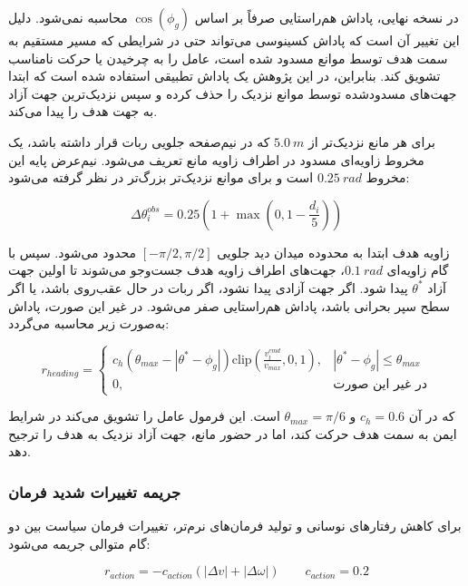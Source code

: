 در نسخه نهایی، پاداش هم‌راستایی صرفاً بر اساس \(\cos(\phi_g)\) محاسبه نمی‌شود. دلیل این تغییر آن است که پاداش کسینوسی می‌تواند حتی در شرایطی که مسیر مستقیم به سمت هدف توسط موانع مسدود شده است، عامل را به چرخیدن یا حرکت نامناسب تشویق کند. بنابراین، در این پژوهش یک پاداش تطبیقی استفاده شده است که ابتدا جهت‌های مسدودشده توسط موانع نزدیک را حذف کرده و سپس نزدیک‌ترین جهت آزاد به جهت هدف را پیدا می‌کند.

برای هر مانع نزدیک‌تر از \(5.0~m\) که در نیم‌صفحه جلویی ربات قرار داشته باشد، یک مخروط زاویه‌ای مسدود در اطراف زاویه مانع تعریف می‌شود. نیم‌عرض پایه این مخروط \(0.25~rad\) است و برای موانع نزدیک‌تر بزرگ‌تر در نظر گرفته می‌شود:

\begin{equation}
	\Delta\theta^{obs}_i
	=0.25\left(1+\max\left(0,1-\frac{d_i}{5}\right)\right)
	\label{eq:obstacle_blocking_cone_final}
\end{equation}

زاویه هدف ابتدا به محدوده میدان دید جلویی \([-\pi/2,\pi/2]\) محدود می‌شود. سپس با گام زاویه‌ای \(0.1~rad\)، جهت‌های اطراف زاویه هدف جست‌وجو می‌شوند تا اولین جهت آزاد \(\theta^*\) پیدا شود. اگر جهت آزادی پیدا نشود، اگر ربات در حال عقب‌روی باشد، یا اگر سطح سپر بحرانی باشد، پاداش هم‌راستایی صفر می‌شود. در غیر این صورت، پاداش به‌صورت زیر محاسبه می‌گردد:

\begin{equation}
	r_{heading}=
	\begin{cases}
		c_h\left(\theta_{max}-|\theta^*-\phi_g|\right)
		\mathrm{clip}\left(\frac{v^{cmd}_t}{v_{max}},0,1\right),
		& |\theta^*-\phi_g|\le\theta_{max}\\
		0, & \text{در غیر این صورت}
	\end{cases}
	\label{eq:adaptive_heading_reward_final}
\end{equation}

که در آن \(c_h=0.6\) و \(\theta_{max}=\pi/6\) است. این فرمول عامل را تشویق می‌کند در شرایط ایمن به سمت هدف حرکت کند، اما در حضور مانع، جهت آزاد نزدیک به هدف را ترجیح دهد.

\subsubsection{جریمه تغییرات شدید فرمان}
\label{subsubsec:action_smooth_reward_final}

برای کاهش رفتارهای نوسانی و تولید فرمان‌های نرم‌تر، تغییرات فرمان سیاست بین دو گام متوالی جریمه می‌شود:

\begin{equation}
	r_{action} = -c_{action}\left(|\Delta v|+|\Delta\omega|\right)
	\qquad
	c_{action}=0.2
	\label{eq:action_change_penalty_final}
\end{equation}

